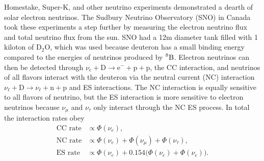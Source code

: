 Homestake, Super-K, and other neutrino experiments demonstrated
a dearth of solar electron neutrinos. The Sudbury Neutrino Observatory (SNO)
in Canada took these experiments a step further by measuring the
electron neutrino flux and total neutrino flux from the sun. SNO had a 12m
diameter tank filled with 1 kiloton of $\text{D}_2\text{O}$, which was used
because deuteron has a small binding energy compared to the energies of
neutrinos produced by $\prescript{8}{}{\text{B}}$. Electron neutrinos can then
be detected through
$\nu_e+\text{D}\to\text{e}^-+\text{p}+\text{p}$,
the CC interaction, and neutrinos of all flavors
interact with the deuteron via the neutral current (NC) interaction
$\nu_\ell+\text{D}\to\nu_\ell+\text{n}+\text{p}$ and ES interactions. The NC
interaction is equally sensitive to all flavors of neutrino, but the ES
interaction is more sensitive to electron neutrinos because $\nu_\mu$ and
$\nu_\tau$ only interact through the NC ES process. In total the interaction
rates obey
\begin{equation}
  \begin{aligned}
    \text{CC rate}&\propto\Phi(\nu_e), \\
    \text{NC rate}&\propto\Phi(\nu_e)+\Phi(\nu_\mu)+\Phi(\nu_\tau), \\
    \text{ES rate}&\propto\Phi(\nu_e)+0.154\big(\Phi(\nu_e)+\Phi(\nu_e)\big).
  \end{aligned}
\end{equation}

